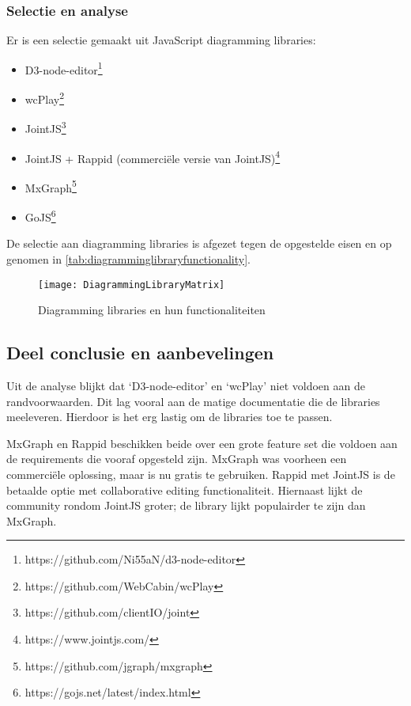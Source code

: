 \subsubsection{Selectie en analyse}
Er is een selectie gemaakt uit JavaScript diagramming libraries:
\begin{itemize}
    \item D3-node-editor\footnote{https://github.com/Ni55aN/d3-node-editor}
    \item wcPlay\footnote{https://github.com/WebCabin/wcPlay}
    \item JointJS\footnote{ https://github.com/clientIO/joint}
    \item JointJS + Rappid (commerciële versie van JointJS)\footnote{https://www.jointjs.com/}
    \item MxGraph\footnote{https://github.com/jgraph/mxgraph}
    \item GoJS\footnote{https://gojs.net/latest/index.html}
\end{itemize}

\noindent De selectie aan diagramming libraries is afgezet tegen de opgestelde eisen en op genomen in \autoref{tab:diagramminglibraryfunctionality}.

\begin{figure}[H]
    \texttt{[image: DiagrammingLibraryMatrix]}
    \caption[]{Diagramming libraries en hun functionaliteiten \footnotemark}
    \label{tab:diagramminglibraryfunctionality}
    \centering
\end{figure}

\subsection{Deel conclusie en aanbevelingen}
Uit de analyse blijkt dat ‘D3-node-editor’ en ‘wcPlay’ niet voldoen aan de randvoorwaarden. Dit lag vooral aan de matige documentatie die de libraries meeleveren. Hierdoor is het erg lastig om de libraries toe te passen.

MxGraph en Rappid beschikken beide over een grote feature set die voldoen aan de requirements die vooraf opgesteld zijn. MxGraph was voorheen een commerciële oplossing, maar is nu gratis te gebruiken. Rappid met JointJS is de betaalde optie met collaborative editing functionaliteit. Hiernaast lijkt de community rondom JointJS groter; de library lijkt populairder te zijn dan MxGraph.

